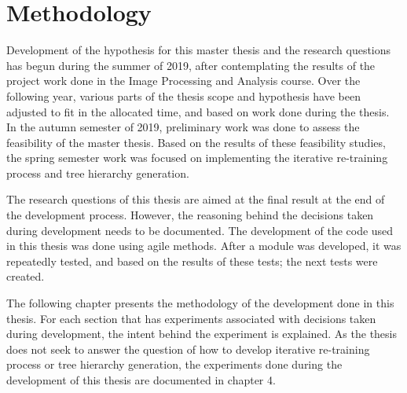 \chapter{Methodology}

Development of the hypothesis for this master thesis and the research questions has begun during the summer of 2019, after contemplating the results of the project work done in the Image Processing and Analysis course.
Over the following year, various parts of the thesis scope and hypothesis have been adjusted to fit in the allocated time, and based on work done during the thesis.
In the autumn semester of 2019, preliminary work was done to assess the feasibility of the master thesis.
Based on the results of these feasibility studies, the spring semester work was focused on implementing the iterative re-training process and tree hierarchy generation.

The research questions of this thesis are aimed at the final result at the end of the development process. 
However, the reasoning behind the decisions taken during development needs to be documented.
The development of the code used in this thesis was done using agile methods.
After a module was developed, it was repeatedly tested, and based on the results of these tests; the next tests were created.

The following chapter presents the methodology of the development done in this thesis.
For each section that has experiments associated with decisions taken during development, the intent behind the experiment is explained.
As the thesis does not seek to answer the question of how to develop iterative re-training process or tree hierarchy generation, the experiments done during the development of this thesis are documented in chapter 4.





